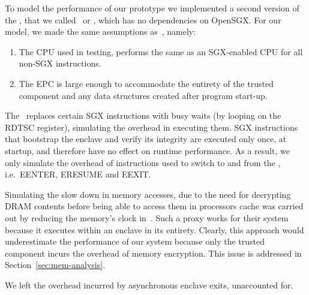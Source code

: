 \documentclass[../../../main.tex]{subfiles}
\begin{document}
\label{sec:perfmodel}
To model the performance of our prototype we implemented a second version of
the \enclaveprogram, that we called \busywait~or \enclavemodel, which
has no dependencies on OpenSGX. For our model, we made the same assumptions
as~\cite{Baumann14}, namely:
\begin{enumerate}
  \item The CPU used in testing, performs the same as an SGX-enabled CPU for
    all non-SGX instructions.
  \item The EPC is large enough to accommodate the entirety of the trusted
    component and any data structures created after program start-up.
\end{enumerate}

The \busywait~replaces certain SGX instructions with busy waits (by looping on
the RDTSC register), simulating the overhead in executing them. SGX
instructions that bootstrap the enclave and verify its integrity are executed
only once, at startup, and therefore have no effect on runtime performance. As
a result, we only simulate the overhead of instructions used to switch to and
from the \enclaveprogram, i.e.\ EENTER, ERESUME and EEXIT.

Simulating the slow down in memory accesses, due to the need for decrypting
DRAM contents before being able to access them in processors cache was carried
out by reducing the memory's clock in~\cite{Baumann14}. Such a proxy works for
their system because it executes within an enclave in its entirety. Clearly,
this approach would underestimate the performance of our system because only
the trusted component incurs the overhead of memory encryption. This issue is
addressed in Section~\ref{sec:mem-analysis}.

We left the overhead incurred by asynchronous enclave exits, unaccounted for.
\end{document}
